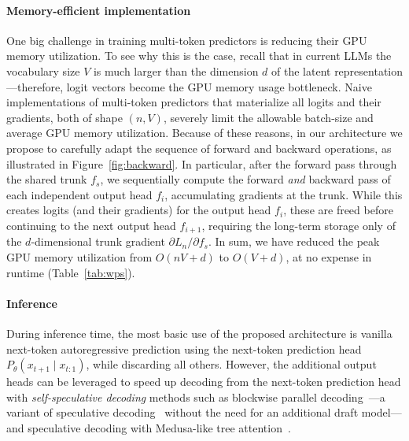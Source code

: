\paragraph{Memory-efficient implementation}
One big challenge in training multi-token predictors is reducing their GPU memory utilization.
To see why this is the case, recall that in current LLMs the vocabulary size $V$ is much larger than the dimension $d$ of the latent representation---therefore, logit vectors become the GPU memory usage bottleneck.
Naive implementations of multi-token predictors that materialize all logits and their gradients, both of shape $(n, V)$, severely limit the allowable batch-size and average GPU memory utilization.
Because of these reasons, in our architecture we propose to carefully adapt the sequence of forward and backward operations, as illustrated in Figure~\ref{fig:backward}.
In particular, after the forward pass through the shared trunk $f_s$, we sequentially compute the forward \emph{and} backward pass of each independent output head $f_i$, accumulating gradients at the trunk.
While this creates logits (and their gradients) for the output head $f_i$, these are freed before continuing to the next output head $f_{i+1}$, requiring the long-term storage only of the $d$-dimensional trunk gradient $\partial L_n / \partial f_s$.
In sum, we have reduced the peak GPU memory utilization from $O(nV + d)$ to $O(V + d)$, at no expense in  runtime (Table~\ref{tab:wps}).

\paragraph{Inference}
During inference time, the most basic use of the proposed architecture is vanilla next-token autoregressive prediction using the next-token prediction head $P_\theta(x_{t+1} \mid x_{t:1})$, while discarding all others.
However, the additional output heads can be leveraged to speed up decoding from the next-token prediction head with \emph{self-speculative decoding} methods such as blockwise parallel decoding~\citep{stern2018blockwise}---a variant of speculative decoding~\citep{leviathan2023fast} without the need for an additional draft model---and speculative decoding with Medusa-like tree attention~\citep{cai2024medusa}.









